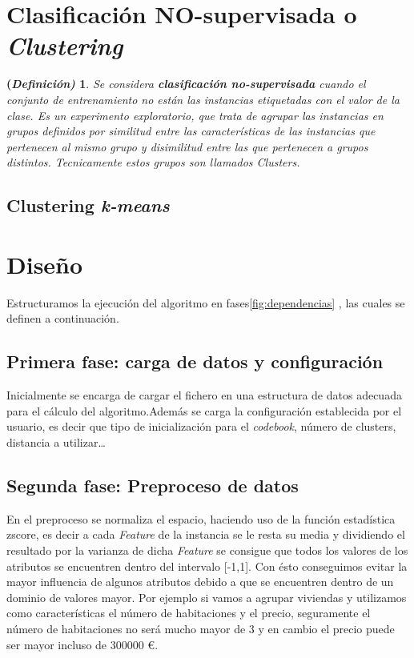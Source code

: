 \documentclass[10pt,a4paper]{article}
\newtheorem{defi}{(\it Definición)}[section]%
\begin{document}
\section{Clasificación \textbf{NO-supervisada} o \textit{Clustering}}

\begin{defi}
	Se considera \textbf{clasificación no-supervisada} cuando el conjunto de
	entrenamiento  no están las instancias etiquetadas con el valor de la clase. Es
	un experimento exploratorio, que trata de agrupar las instancias en grupos
	definidos por similitud entre las características de las instancias que
	pertenecen al mismo grupo y disimilitud entre las que pertenecen a grupos
	distintos. Tecnicamente estos grupos son llamados \textit{Clusters}.
\end{defi}

\subsection{Clustering \textit{\textbf{k-means}}}


\section{Diseño}
 
 Estructuramos la ejecución del algoritmo en fases\ref{fig:dependencias} , las cuales se definen a continuación.\\
 
\subsection*{Primera fase: carga de datos y configuración}
 
 Inicialmente se encarga de cargar el fichero en una estructura de datos adecuada para el cálculo del algoritmo.Además se carga la configuración establecida
 por el usuario, es decir que tipo de inicialización para el \textit{codebook}, número de clusters, distancia a utilizar\dots

\subsection*{Segunda fase: Preproceso de datos}

En el preproceso se normaliza el espacio, haciendo uso de la función estadística zscore, es decir a cada \textit{Feature} de la instancia se le resta su media y dividiendo el resultado por la varianza de dicha \textit{Feature} se consigue que todos los valores de los atributos se encuentren dentro del intervalo [-1,1]. Con ésto conseguimos evitar la mayor influencia de algunos atributos debido a que se encuentren dentro de un dominio de valores mayor. Por ejemplo si vamos a agrupar viviendas y utilizamos como características el número de habitaciones y el precio, seguramente el número de habitaciones no será mucho mayor de 3 y en cambio el precio puede ser mayor incluso de 300000 \euro .\cite{coursera}
\end{document}
